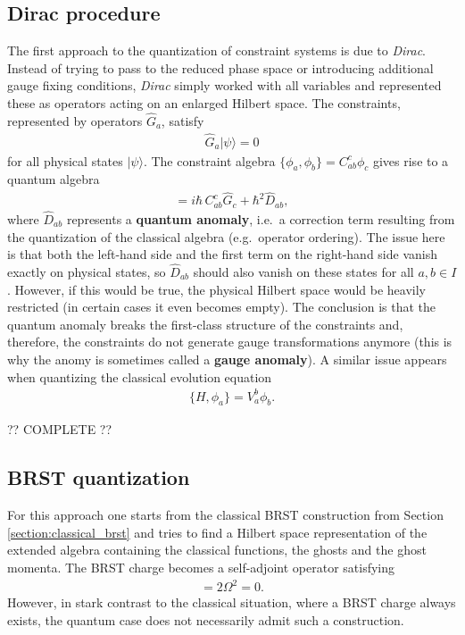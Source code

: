 \subsection{Dirac procedure}

    The first approach to the quantization of constraint systems is due to \textit{Dirac}. Instead of trying to pass to the reduced phase space or introducing additional gauge fixing conditions, \textit{Dirac} simply worked with all variables and represented these as operators acting on an enlarged Hilbert space. The constraints, represented by operators $\hat{G}_a$, satisfy
    \begin{gather}
        \hat{G}_a|\psi\rangle=0
    \end{gather}
    for all physical states $|\psi\rangle$. The constraint algebra $\{\phi_a,\phi_b\} = C^c_{ab}\phi_c$ gives rise to a quantum algebra
    \begin{gather}
        [\hat{G}_a,\hat{G}_b] = i\hbar\,C^c_{ab}\hat{G}_c + \hbar^2\hat{D}_{ab},
    \end{gather}
    where $\hat{D}_{ab}$ represents a \textbf{quantum anomaly}, i.e.~a correction term resulting from the quantization of the classical algebra (e.g.~operator ordering). The issue here is that both the left-hand side and the first term on the right-hand side vanish exactly on physical states, so $\hat{D}_{ab}$ should also vanish on these states for all $a,b\in I$. However, if this would be true, the physical Hilbert space would be heavily restricted (in certain cases it even becomes empty). The conclusion is that the quantum anomaly breaks the first-class structure of the constraints and, therefore, the constraints do not generate gauge transformations anymore (this is why the anomy is sometimes called a \textbf{gauge anomaly}). A similar issue appears when quantizing the classical evolution equation
    \begin{gather}
        \{H,\phi_a\} = V_a^b\phi_b.
    \end{gather}

    ?? COMPLETE ??

\subsection{BRST quantization}

    For this approach one starts from the classical BRST construction from Section \ref{section:classical_brst} and tries to find a Hilbert space representation of the extended algebra containing the classical functions, the ghosts and the ghost momenta. The BRST charge becomes a self-adjoint operator satisfying
    \begin{gather}
        [\Omega,\Omega] = 2\Omega^2 = 0.
    \end{gather}
    However, in stark contrast to the classical situation, where a BRST charge always exists, the quantum case does not necessarily admit such a construction.

